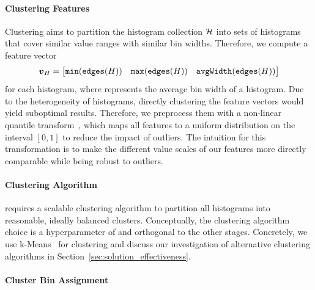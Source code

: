 \paragraph{Clustering Features}
Clustering aims to partition the histogram collection $\mathcal{H}$ into sets of histograms that cover similar value ranges with similar bin widths.
Therefore, we compute a feature vector
\[
\boldsymbol{v}_{H} = \begin{bmatrix}\FuncSty{min}(\edges{H}) & \FuncSty{max}(\edges{H}) & \FuncSty{avgWidth}(\edges{H})\end{bmatrix}
\]
for each histogram, where  represents the average bin width of a histogram.
Due to the heterogeneity of histograms, directly clustering the feature vectors would yield suboptimal results.
Therefore, we preprocess them with a non-linear quantile transform~\cite{pedregosa_scikit-learn_2011}, which maps all features to a uniform distribution on the interval $[0, 1]$ to reduce the impact of outliers.
The intuition for this transformation is to make the different value scales of our features more directly comparable while being robust to outliers.

\paragraph{Clustering Algorithm}
\system{} requires a scalable clustering algorithm to partition all histograms into reasonable, ideally balanced clusters.
Conceptually, the clustering algorithm choice is a hyperparameter of \system{} and orthogonal to the other stages.
Concretely, we use k-Means~\cite{lloyd_least_1982} for clustering and discuss our investigation of alternative clustering algorithms in Section~\ref{sec:solution_effectiveness}.

\paragraph{Cluster Bin Assignment}

